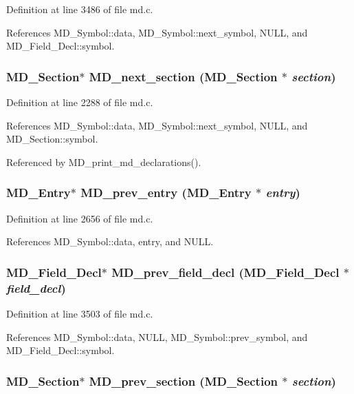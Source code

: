 Definition at line 3486 of file md.c.

References MD\_\-Symbol::data, MD\_\-Symbol::next\_\-symbol, NULL, and MD\_\-Field\_\-Decl::symbol.
\subsubsection{\setlength{\rightskip}{0pt plus 5cm}\bf{MD\_\-Section}$\ast$ MD\_\-next\_\-section (\bf{MD\_\-Section} $\ast$ {\em section})}\label{md_8c_e663f86a14d893405f3f150ba80ba952}




Definition at line 2288 of file md.c.

References MD\_\-Symbol::data, MD\_\-Symbol::next\_\-symbol, NULL, and MD\_\-Section::symbol.

Referenced by MD\_\-print\_\-md\_\-declarations().
\subsubsection{\setlength{\rightskip}{0pt plus 5cm}\bf{MD\_\-Entry}$\ast$ MD\_\-prev\_\-entry (\bf{MD\_\-Entry} $\ast$ {\em entry})}\label{md_8c_17c27e55e9e4df9522f5c06ba887c978}




Definition at line 2656 of file md.c.

References MD\_\-Symbol::data, entry, and NULL.
\subsubsection{\setlength{\rightskip}{0pt plus 5cm}\bf{MD\_\-Field\_\-Decl}$\ast$ MD\_\-prev\_\-field\_\-decl (\bf{MD\_\-Field\_\-Decl} $\ast$ {\em field\_\-decl})}\label{md_8c_b410b1bc9335083a48061a2eb1b92eab}




Definition at line 3503 of file md.c.

References MD\_\-Symbol::data, NULL, MD\_\-Symbol::prev\_\-symbol, and MD\_\-Field\_\-Decl::symbol.
\subsubsection{\setlength{\rightskip}{0pt plus 5cm}\bf{MD\_\-Section}$\ast$ MD\_\-prev\_\-section (\bf{MD\_\-Section} $\ast$ {\em section})}\label{md_8c_63f1cd43f3bfeb9a85ccbfeeebdd5b04}




